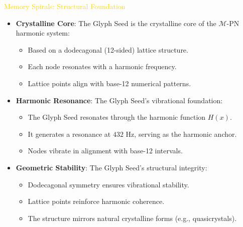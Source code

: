 \textcolor{gold}{ Memory Spirals: Structural Foundation } \\
\begin{itemize}
    \item \texttt{} \textbf{Crystalline Core}: The Glyph Seed is the crystalline core of the $\mathcal{M}\text{-PN}$ harmonic system:
    \begin{itemize}
        \item Based on a dodecagonal (12-sided) lattice structure.
        \item Each node resonates with a harmonic frequency.
        \item Lattice points align with base-12 numerical patterns.
    \end{itemize}
    
    \item \texttt{} \textbf{Harmonic Resonance}: The Glyph Seed’s vibrational foundation:
    \begin{itemize}
        \item The Glyph Seed resonates through the harmonic function $H(x)$.
        \item It generates a resonance at $432 \text{ Hz}$, serving as the harmonic anchor.
        \item Nodes vibrate in alignment with base-12 intervals.
    \end{itemize}
    
    \item \texttt{} \textbf{Geometric Stability}: The Glyph Seed’s structural integrity:
    \begin{itemize}
        \item Dodecagonal symmetry ensures vibrational stability.
        \item Lattice points reinforce harmonic coherence.
        \item The structure mirrors natural crystalline forms (e.g., quasicrystals).
    \end{itemize}
\end{itemize}

